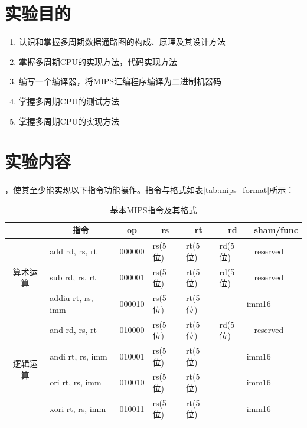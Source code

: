 \documentclass[12pt,UTF8]{ctexart}
\newcommand{\wuhao}{\fontsize{10.5pt}{\baselineskip}\selectfont}
\newcommand{\liuhao}{\fontsize{7.5pt}{\baselineskip}\selectfont}
\begin{document}
\begin{spacing}{1.1}
\wuhao
\section{实验目的}
\begin{enumerate}
	\item 认识和掌握多周期数据通路图的构成、原理及其设计方法
    \item 掌握多周期CPU的实现方法，代码实现方法
    \item 编写一个编译器，将MIPS汇编程序编译为二进制机器码
    \item 掌握多周期CPU的测试方法
    \item 掌握多周期CPU的实现方法
\end{enumerate}


\section{实验内容}
，使其至少能实现以下指令功能操作。指令与格式如表\ref{tab:mips_format}所示：
\begin{table}[H]
  \centering\liuhao
  \caption{基本MIPS指令及其格式}
    \begin{tabular}{|c|l|l|l|l|l|l|}
    \hline
          & \multicolumn{1}{c|}{指令} & \multicolumn{1}{c|}{op} & \multicolumn{1}{c|}{rs} & \multicolumn{1}{c|}{rt} & \multicolumn{1}{c|}{rd} & \multicolumn{1}{c|}{sham/func} \\
    \hline
    \multirow{3}[6]{*}{算术运算} & add rd, rs, rt & 000000 & rs(5位) & rt(5位) & rd(5位) & reserved \\
\cline{2-7}          & sub rd, rs, rt & 000001 & rs(5位) & rt(5位) & rd(5位) & reserved \\
\cline{2-7}          & addiu rt, rs, imm & 000010 & rs(5位) & rt(5位) & \multicolumn{2}{c|}{imm16} \\
    \hline
    \multirow{4}[8]{*}{逻辑运算} & and rd, rs, rt & 010000 & rs(5位) & rt(5位) & rd(5位) & reserved \\
\cline{2-7}          & andi rt, rs, imm & 010001 & rs(5位) & rt(5位) & \multicolumn{2}{c|}{imm16} \\
\cline{2-7}          & ori rt, rs, imm & 010010 & rs(5位) & rt(5位) & \multicolumn{2}{c|}{imm16} \\
\cline{2-7}          & xori rt, rs, imm & 010011 & rs(5位) & rt(5位) & \multicolumn{2}{c|}{imm16} \\

\end{tabular}
\end{table}
\end{spacing}
\end{document}

